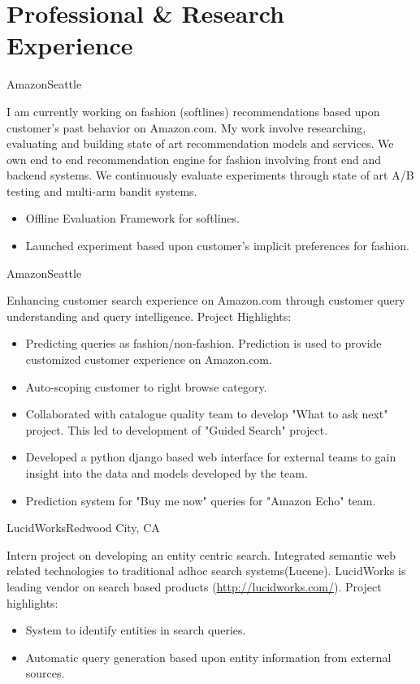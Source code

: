 \documentclass[10pt,a4paper,sans]{moderncv}        %
\begin{document}
\section{Professional \& Research Experience}
 {Amazon}{Seattle}{}{
I am currently working on fashion (softlines) recommendations based upon customer's past behavior on Amazon.com. My work involve researching, evaluating and building state of art recommendation models and services. We own end to end recommendation engine for fashion involving front end and backend systems. We continuously evaluate experiments through state of art A/B testing and multi-arm bandit systems.
\begin{itemize}
\item   Offline Evaluation Framework for softlines.
 \item  Launched experiment based upon customer's implicit preferences for fashion.
\end{itemize}
}
 {Amazon}{Seattle}{}{Enhancing customer search experience on Amazon.com  through customer query understanding and query intelligence. Project Highlights:
\begin{itemize}
\item Predicting queries as fashion/non-fashion. Prediction is used to provide customized customer experience on Amazon.com.
\item  Auto-scoping customer to right browse category.
\item Collaborated with catalogue quality team to develop "What to ask next" project. This led to development of "Guided Search" project.
\item Developed a python django based web interface for external teams to gain insight into the data and models developed by the team.
\item Prediction system for "Buy me now" queries for "Amazon Echo" team.
\end{itemize}
}
 {LucidWorks}{Redwood City, CA}{}{Intern project on developing an entity centric search. Integrated semantic web related technologies to traditional adhoc search systems(Lucene). LucidWorks is leading vendor on search based products (\url{http://lucidworks.com/}). Project highlights:
\begin{itemize}
\item System to identify entities in search queries.
\item Automatic query generation based upon entity information from external sources.
\end{itemize}
}
\end{document}
